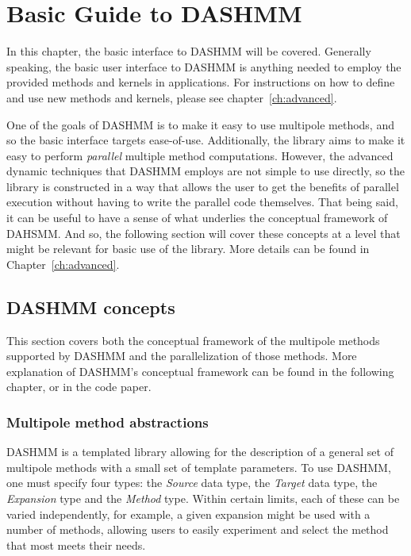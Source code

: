 \chapter{Basic Guide to DASHMM}
\label{ch:basic}

In this chapter, the basic interface to DASHMM will be
covered. Generally speaking, the basic user interface to DASHMM is
anything needed to employ the provided methods and kernels in
applications. For instructions on how to define and use new methods and
kernels, please see chapter~\ref{ch:advanced}.

One of the goals of DASHMM is to make it easy to use multipole
methods, and so the basic interface targets ease-of-use. Additionally,
the library aims to make it easy to perform \emph{parallel} multiple
method computations. However, the advanced dynamic techniques
that DASHMM employs are not simple to use directly, so the library is
constructed in a way that allows the user to get the benefits of
parallel execution without having to write the parallel code
themselves. That being said, it can be useful to have a sense of what
underlies the conceptual framework of DAHSMM. And so, the following
section will cover these concepts at a level that might be relevant
for basic use of the library. More details can be found in
Chapter~\ref{ch:advanced}.

\section{DASHMM concepts}
This section covers both the conceptual framework of the multipole
methods supported by DASHMM and the parallelization of those
methods. More explanation of DASHMM's conceptual framework can be
found in the following chapter, or in the code paper.

\subsection{Multipole method abstractions}

DASHMM is a templated library allowing for the description of a
general set of multipole methods with a small set of template
parameters. To use DASHMM, one must specify four types: the {\it Source}
data type, the {\it Target} data type, the {\it Expansion} type and
the {\it Method} type. Within certain limits, each of these can be
varied independently, for example, a given expansion might be used
with a number of methods, allowing users to easily experiment and
select the method that most meets their needs.

